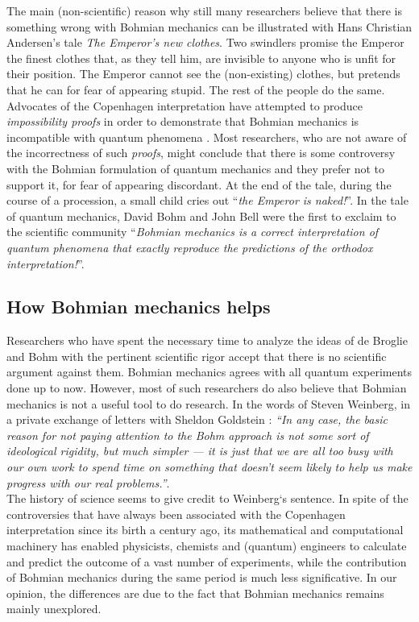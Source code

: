 \documentclass[onecolumn,nofootinbib, secnumarabic, amsmath, nobibnotes,12pt,aps,pra]{revtex4-1}
\begin{document}
The main (non-scientific) reason why still many researchers believe that there is something wrong with Bohmian mechanics can be illustrated with Hans Christian Andersen's tale \emph{The Emperor's new clothes}. Two swindlers promise the Emperor the finest clothes that, as they tell him,  are invisible to anyone who is unfit for their position. The Emperor cannot see the (non-existing) clothes, but pretends that he can for fear of appearing stupid.  The rest of the people do the same. Advocates of the Copenhagen interpretation have attempted to produce \emph{impossibility proofs} in order to demonstrate that Bohmian mechanics is incompatible with quantum phenomena \cite{om.impossibility_proofs}. Most researchers, who are not aware of the incorrectness of such \emph{proofs}, might conclude that there is some controversy with the Bohmian formulation of quantum mechanics and they prefer not to support it, for fear of appearing discordant. At the end of the tale, during the course of a procession, a small child cries out ``\textit{the Emperor is naked!}''. In the tale of quantum mechanics, David Bohm \cite{om.bohm1952a,om.bohm1952b} and John Bell \cite{om.Bell1987} were the first to exclaim to the scientific community ``\textit{Bohmian mechanics is a correct interpretation of quantum phenomena that exactly reproduce the predictions of the orthodox interpretation!}''.

\subsection*{How Bohmian mechanics helps}\label{sec_why}


Researchers who have spent the necessary time to analyze the ideas of de Broglie and Bohm with the pertinent scientific rigor accept that there is no scientific argument against them. Bohmian mechanics agrees with all quantum experiments done up to now. However, most of such researchers do also believe that Bohmian mechanics is not a useful tool to do research. In the words of Steven Weinberg, in a private exchange of letters with Sheldon Goldstein \cite{om.Weinberg}: \textit{``In any case, the basic reason for not paying attention to the Bohm approach is not some sort of ideological rigidity, but much simpler --- it is just that we are all too busy with our own work to spend time on something that doesn't seem likely to help us make progress with our real problems.''}.\\

The history of science seems to give credit to Weinberg`s sentence. In spite of the controversies that have always been associated with the Copenhagen interpretation since its birth a century ago, its mathematical and computational machinery has enabled physicists, chemists and (quantum) engineers to calculate and predict the outcome of a vast number of experiments, while the contribution of Bohmian mechanics during the same period is much less significative. In our opinion, the differences are due to the fact that Bohmian mechanics remains mainly unexplored.
\end{document}
